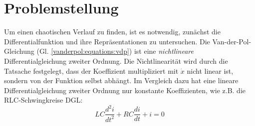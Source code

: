 %
%
%
\section{Problemstellung
\label{vanderpol:section:problemstellung}}
Um einen chaotischen Verlauf zu finden, ist es notwendig, zunächst die Differentialfunktion und ihre Repräsentationen zu untersuchen.
Die Van-der-Pol-Gleichung (Gl. \ref{vanderpol:equations:vdp}) ist eine {\em nichtlineare} Differentialgleichung zweiter Ordnung. 
Die Nichtlinearität wird durch die Tatsache festgelegt, dass der Koeffizient multipliziert mit $\dot{x}$ nicht linear ist, sondern von der Funktion selbst abhängt.
Im Vergleich dazu hat eine lineare Differentialgleichung zweiter Ordnung nur konstante Koeffizienten, wie z.B. die RLC-Schwingkreise DGL:
\begin{equation*}
	LC \frac{d^{2} i}{d t^{2}}+RC \frac{d i}{d t}+i = 0
\end{equation*}

